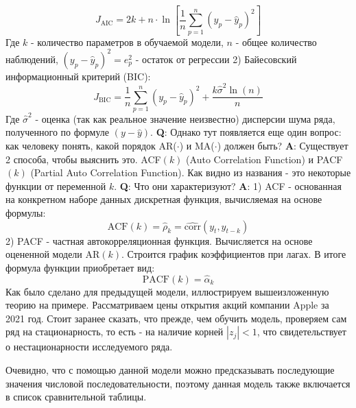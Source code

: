 	\begin{equation}
		J_{\text{AIC}} = 2k + n \cdot \ln\left[\frac{1}{n} \sum_{p = 1}^n \left(y_p- \hat{y}_p \right)^2\right]
	\end{equation}
	Где $k$ - количество параметров в обучаемой модели, $n$ - общее количество наблюдений, $(y_p - \hat{y}_p)^2 = e_p^2$ - остаток от регрессии 2) Байесовский информационный критерий (BIC):
	\begin{equation}
	 J_{\text{BIC}} = \frac{1}{n} \sum_{p = 1}^n \left(y_p - \hat{y}_p \right)^2 + \frac{k \hat{\sigma}^2 \ln(n)}{n}
	\end{equation} 
	Где $\hat{\sigma}^2$ - оценка (так как реальное значение неизвестно) дисперсии шума ряда, полученного по формуле $(y - \hat{y})$. \cite{alexandridis2014wavelet} \textbf{Q}: Однако тут появляется еще один вопрос: как человеку понять, какой порядок AR($\cdot$) и MA($\cdot$) должен быть? \textbf{A}: Существует 2 способа, чтобы выяснить это. ACF$(k)$ (Auto Correlation Function) и PACF$(k)$ (Partial Auto Correlation Function). Как видно из названия - это некоторые функции от переменной $k$. \textbf{Q}: Что они характеризуют? \textbf{A}: 1) ACF - основанная на конкретном наборе данных дискретная функция, вычисляемая на основе формулы: 
	\begin{equation}
		\text{ACF}(k) = \hat{\rho}_k = \hat{\text{corr}}(y_t, y_{t - k})
	\end{equation}
	2) PACF - частная автокорреляционная функция. Вычисляется на основе оцененной модели AR$(k)$. Строится график коэффициентов при лагах. В итоге формула функции приобретает вид:
	\begin{equation}
		\text{PACF}(k) = \hat{\alpha}_k
	\end{equation}
	Как было сделано для предыдущей модели, иллюстрируем вышеизложенную теорию на примере. Рассматриваем цены открытия акций компании Apple за 2021 год. Стоит заранее сказать, что прежде, чем обучить модель, проверяем сам ряд на стационарность, то есть - на наличие корней $|z_j| < 1$, что свидетельствует о нестационарности исследуемого ряда. 
	
	
	Очевидно, что с помощью данной модели можно предсказывать последующие значения числовой последовательности, поэтому данная модель также включается в список сравнительной таблицы.